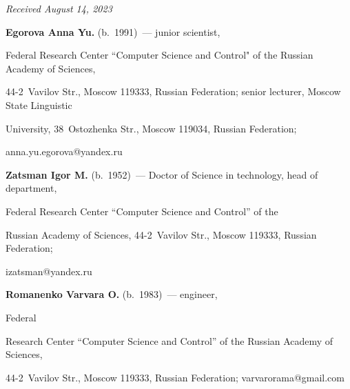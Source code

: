 \vspace*{-6pt}





\hfill{\small\textit{Received August 14, 2023}} 








\Contr





\vspace*{-2pt}





\noindent


\textbf{Egorova Anna Yu.} (b.\ 1991)~--- junior scientist, %


Federal Research Center ``Computer Science and Control" of the Russian Academy of Sciences,  


44-2~Vavilov Str., Moscow 119333, Russian Federation; senior lecturer, Moscow State Linguistic 


University, 38~Ostozhenka Str., Moscow 119034, Russian Federation; 


\mbox{anna.yu.egorova@yandex.ru}





\vspace*{3pt}





\noindent


\textbf{Zatsman Igor M.} (b.\ 1952)~--- Doctor of Science in technology, head of department, 




Federal Research Center ``Computer Science and Control'' of the 


Russian Academy of Sciences, 44-2~Vavilov Str., Moscow 119333, Russian Federation; 


\mbox{izatsman@yandex.ru}





\vspace*{3pt}








\noindent


\textbf{Romanenko Varvara O.} (b.\ 1983)~--- engineer, %


Federal 


Research Center ``Computer Science and Control'' of the Russian Academy of Sciences,  


44-2~Vavilov Str., Moscow 119333, Russian Federation; \mbox{varvarorama@gmail.com}











\label{end\stat}





\renewcommand{\bibname}{\protect\rm Литература}    


